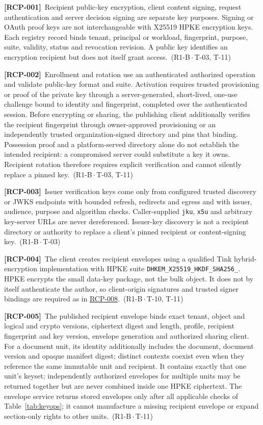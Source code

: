 \documentclass[11pt,a4paper]{article}
\newcommand{\code}[1]{{\small\nolinkurl{#1}}}
\newcommand{\rr}[1]{\hyperlink{req:#1}{#1}}
\newcommand{\reqtag}[2]{{\footnotesize\color{accent}(#1\,$\cdot$\,#2)}}
\newcommand{\req}[4]{\par\noindent\hypertarget{req:#1}{\textbf{[#1]}}\ #4\ \reqtag{#2}{#3}\par}
\begin{document}
\req{RCP-001}{R1-B}{T-03, T-11}{Recipient public-key encryption, client content signing, request authentication and server decision signing are separate key purposes. Signing or OAuth proof keys are not interchangeable with X25519 HPKE encryption keys. Each registry record binds tenant, principal or workload, fingerprint, purpose, suite, validity, status and revocation revision. A public key identifies an encryption recipient but does not itself grant access.}
\req{RCP-002}{R1-B}{T-03, T-11}{Enrollment and rotation use an authenticated authorized operation and validate public-key format and suite. Activation requires trusted provisioning or proof of the private key through a server-generated, short-lived, one-use challenge bound to identity and fingerprint, completed over the authenticated session. Before encrypting or sharing, the publishing client additionally verifies the recipient fingerprint through owner-approved provisioning or an independently trusted organization-signed directory and pins that binding. Possession proof and a platform-served directory alone do not establish the intended recipient: a compromised server could substitute a key it owns. Recipient rotation therefore requires explicit verification and cannot silently replace a pinned key.}
\req{RCP-003}{R1-B}{T-03}{Issuer verification keys come only from configured trusted discovery or JWKS endpoints with bounded refresh, redirects and egress and with issuer, audience, purpose and algorithm checks. Caller-supplied \code{jku}, \code{x5u} and arbitrary key-server URLs are never dereferenced. Issuer-key discovery is not a recipient directory or authority to replace a client's pinned recipient or content-signing key.}
\req{RCP-004}{R1-B}{T-10, T-11}{The client creates recipient envelopes using a qualified Tink hybrid-encryption implementation with HPKE suite \code{DHKEM_X25519_HKDF_SHA256_}\allowbreak\code{HKDF_SHA256_AES_256_GCM}. HPKE encrypts the small data-key package, not the bulk object. It does not by itself authenticate the author, so client-origin signatures and trusted signer bindings are required as in \rr{RCP-008}.}
\req{RCP-005}{R1-B}{T-11}{The published recipient envelope binds exact tenant, object and logical and crypto versions, ciphertext digest and length, profile, recipient fingerprint and key version, envelope generation and authorized sharing client. For a document unit, its identity additionally includes the document, document version and opaque manifest digest; distinct contexts coexist even when they reference the same immutable unit and recipient. It contains exactly that one unit's keyset; independently authorized envelopes for multiple units may be returned together but are never combined inside one HPKE ciphertext. The envelope service returns stored envelopes only after all applicable checks of Table~\ref{tab:keyops}; it cannot manufacture a missing recipient envelope or expand section-only rights to other units.}
\end{document}
